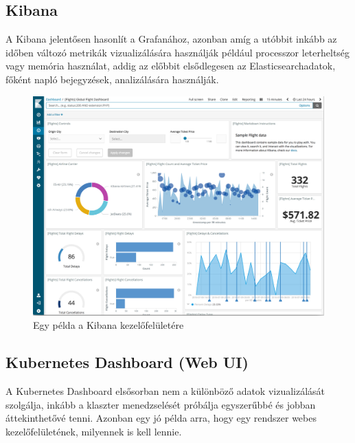 \subsection{Kibana}
A Kibana\cite{kibana} jelentősen hasonlít a Grafanához, azonban amíg a utóbbit inkább az időben változó metrikák vizualizálására használják például processzor leterheltség vagy memória használat,
addig az előbbit elsődlegesen az Elasticsearch\footenotemark adatok, főként napló bejegyzések, analizálására használják.


\begin{figure}[!ht]
    \centering
    \includegraphics[width=150mm, keepaspectratio]{figures/kibana-dashboard.png}
    \caption{Egy példa a Kibana kezelőfelületére}
    \label{fig:kibana}
\end{figure}

\subsection{Kubernetes Dashboard (Web UI)}
A Kubernetes Dashboard\cite{kubernetes-dashboard} elsősorban nem a különböző adatok vizualizálását szolgálja, inkább a klaszter menedzselését próbálja egyszerűbbé és jobban áttekinthetővé tenni.
Azonban egy jó példa arra, hogy egy rendszer webes kezelőfelületének, milyennek is kell lennie.

